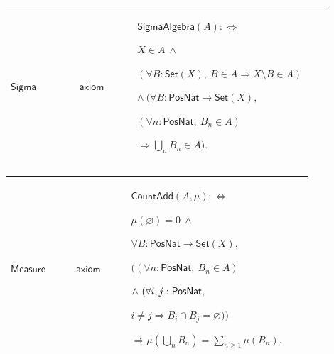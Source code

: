 \documentclass[12pt,reqno]{amsart}
\theoremstyle{blueplain}
\numberwithin{equation}{section}
\begin{document}
{\scriptsize \setlength{\parskip}{0pt}\nointerlineskip
\noindent 
\begin{tabular}{|@{}>{\centering\arraybackslash}m{0.19251\linewidth}|>{\centering\arraybackslash}m{0.16845\linewidth}|>{\centering\arraybackslash}m{0.53904\linewidth}|}
\hline
\hypertarget{ax:Sigma}{$\displaystyle \mathsf{Sigma}$} & $\displaystyle 
\mathsf{axiom}$ & $\displaystyle \mathsf{SigmaAlgebra}(A):\Longleftrightarrow
$\par$\displaystyle X\in A\ \land$\par$\displaystyle (\forall B:\mathsf{Set}%
(X),\ B\in A\Rightarrow X\setminus B\in A)$\par$\displaystyle \land\
(\forall B:\mathsf{PosNat}\to\mathsf{Set}(X),$\par$\displaystyle (\forall n:%
\mathsf{PosNat},\ B_n\in A)$\par$\displaystyle \Rightarrow\bigcup_n B_n\in
A).$ \\ \hline
\end{tabular}%
}

{\scriptsize \setlength{\parskip}{0pt}\nointerlineskip
\noindent 
\begin{tabular}{|@{}>{\centering\arraybackslash}m{0.19251\linewidth}|>{\centering\arraybackslash}m{0.16845\linewidth}|>{\centering\arraybackslash}m{0.53904\linewidth}|}
\hline
\hypertarget{ax:Measure}{$\displaystyle \mathsf{Measure}$} & $\displaystyle 
\mathsf{axiom}$ & $\displaystyle \mathsf{CountAdd}(A,\mu):\Longleftrightarrow
$\par$\displaystyle \mu(\varnothing)=0\ \land$\par$\displaystyle \forall B:%
\mathsf{PosNat}\to\mathsf{Set}(X),$\par$\displaystyle \bigl((\forall n:%
\mathsf{PosNat},\ B_n\in A)$\par$\displaystyle \land\ (\forall i,j:\mathsf{%
PosNat},$\par$\displaystyle i\ne j\Rightarrow B_i\cap B_j=\varnothing)\bigr)$%
\par$\displaystyle \Rightarrow\mu(\bigcup_n B_n)=\sum_{n\ge1}\mu(B_n).$ \\ 
\hline
\end{tabular}%
}
\end{document}
